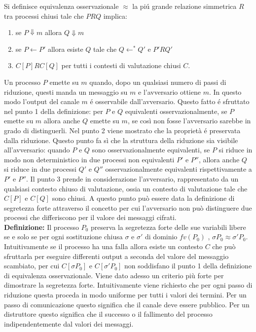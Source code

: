 \documentclass[12pt]{report}
\begin{document}
Si definisce equivalenza osservazionale $\approx$ la piú grande relazione simmetrica $R$ tra processi chiusi tale che $PRQ$ implica:\\
\begin{enumerate}
    \item se $P \Downarrow m$ allora $Q \Downarrow m$
    \item se $P \leftarrow P'$ allora esiste $Q$ tale che $Q \leftarrow^* Q'$ e $P'RQ'$
    \item $C[P]RC[Q]$ per tutti i contesti di valutazione chiusi $C$.
\end{enumerate}
Un processo $P$ emette su $m$ quando, dopo un qualsiasi numero di passi di riduzione, questi manda un messaggio su $m$ e l'avversario ottiene $m$. In questo modo l'output del canale $m$ é osservabile dall'avversario. Questo fatto é sfruttato nel punto 1 della definizione: per $P$ e $Q$ equivalenti osservazionalmente, se $P$ emette su $m$ allora anche $Q$ emette su $m$, se così non fosse l'avversario sarebbe in grado di distinguerli. Nel punto 2 viene mostrato che la proprietà é preservata dalla riduzione. Questo punto fa sì che la struttura della riduzione sia visibile all'avversario: quando $P$ e $Q$ sono osservazionalmente equivalenti, se $P$ si riduce in modo non deterministico in due processi non equivalenti $P'$ e $P''$, allora anche $Q$ si riduce in due processi $Q'$ e $Q''$ osservazionalmente equivalenti rispettivamente a $P'$ e $P''$. Il punto 3 prende in considerazione l'avversario, rappresentato da un qualsiasi contesto chiuso di valutazione, ossia un contesto di valutazione tale che $C[P]$ e $C[Q]$ sono chiusi. A questo punto può essere data la definizione di segretezza forte attraverso il concetto per cui l'avversario non può distinguere due processi che differiscono per il valore dei messaggi cifrati.\\

\textbf{Definizione:} Il processo $P_0$ preserva la segretezza forte delle sue variabili libere se e solo se per ogni sostituzione chiusa $\sigma$ e $\sigma'$ di dominio $fv(P_0)$ , $\sigma P_0 \approx \sigma' P_0$.\\

Intuitivamente se il processo ha una falla allora esiste un contesto $C$ che può sfruttarla per eseguire differenti output a seconda del valore del messaggio scambiato, per cui $C[\sigma P_0]$ e $C[\sigma' P_0]$ non soddisfano il punto 1 della definizione di equivalenza osservazionale. Viene dato adesso un criterio più forte per dimostrare la segretezza forte. Intuitivamente viene richiesto che per ogni passo di riduzione questa proceda in modo uniforme per tutti i valori dei termini. Per un passo di comunicazione questo significa che il canale deve essere pubblico. Per un distruttore questo significa che il successo o il fallimento del processo indipendentemente dal valori dei messaggi.\\
\end{document}
